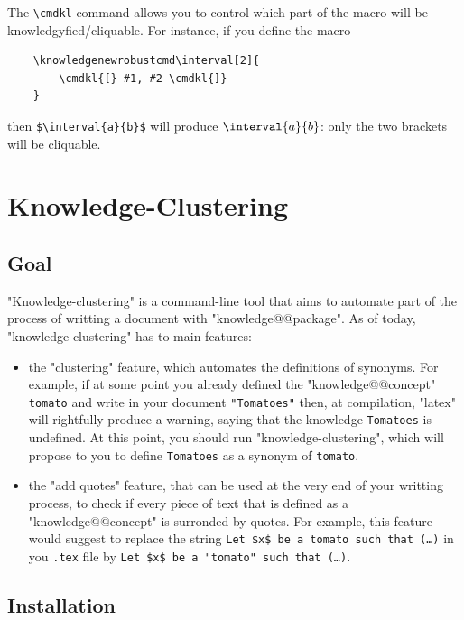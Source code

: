 \documentclass{article}
\begin{document}
The \verb|\cmdkl| command allows you to control which part of the macro will be
knowledgyfied/cliquable. For instance, if you define the macro
\AP{}
\begin{verbatim}
    \knowledgenewrobustcmd\interval[2]{
        \cmdkl{[} #1, #2 \cmdkl{]}
    }
\end{verbatim}
then \verb|$\interval{a}{b}$| will produce $\interval{a}{b}$: only the two
brackets will be cliquable.


\section{Knowledge-Clustering}

\subsection{Goal}

"Knowledge-clustering" is a command-line tool that aims to automate part of
the process of writting a document with "knowledge@@package".
As of today, "knowledge-clustering" has to main features:
\begin{itemize}
    \item the "clustering" feature, which automates the definitions
    of synonyms. For example,  if at some point you already defined the 
    "knowledge@@concept" \verb|tomato| and write in your document
    \verb|"Tomatoes"|
    then, at compilation, "latex" will rightfully produce a warning,
    saying that the knowledge \verb|Tomatoes| is undefined.
    At this point, you should run "knowledge-clustering", which will propose to 
    you to define \verb|Tomatoes| as a synonym of \verb|tomato|.
    \item the "add quotes" feature, that can be used at the very end of your 
    writting process, to check if every piece of text that is defined as
    a "knowledge@@concept" is surronded by quotes. For example, this feature 
    would suggest to replace the string \verb|Let $x$ be a tomato such that (…)|
    in you \verb|.tex| file by \verb|Let $x$ be a "tomato" such that (…)|.
\end{itemize}

\subsection{Installation}
\end{document}
